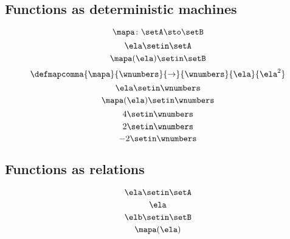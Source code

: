 \begin{forslides}
    \subsection{Functions as deterministic machines}

    \begin{equation}
        \label{eq:slides_session2_94}
        \mapa\colon \setA \sto \setB
    \end{equation}
    \begin{equation}
        \label{eq:slides_session2_95}
        \ela \setin\setA
    \end{equation}
    \begin{equation}
        \label{eq:slides_session2_96}
        \mapa(\ela) \setin\setB
    \end{equation}
    \begin{equation}
        \label{eq:slides_session2_97}
        \defmapcomma{
            \mapa
        }{
            \wnumbers
        }{
            \to
        }{
            \wnumbers
        }{
            \ela
        }{
            \ela^2
        }
    \end{equation}
    \begin{equation}
        \label{eq:slides_session2_98}
        \ela \setin\wnumbers
    \end{equation}
    \begin{equation}
        \label{eq:slides_session2_99}
        \mapa(\ela) \setin\wnumbers
    \end{equation}
    \begin{equation}
        \label{eq:slides_session2_100}
        4 \setin\wnumbers
    \end{equation}
    \begin{equation}
        \label{eq:slides_session2_101}
        2 \setin\wnumbers
    \end{equation}
    \begin{equation}
        \label{eq:slides_session2_102}
        -2 \setin\wnumbers
    \end{equation}

    \subsection{Functions as relations}

    \begin{equation}
        \label{eq:slides_session2_103}
        \ela \setin\setA
    \end{equation}
    \begin{equation}
        \label{eq:slides_session2_104}
        \ela
    \end{equation}
    \begin{equation}
        \label{eq:slides_session2_105}
        \elb \setin \setB
    \end{equation}
    \begin{equation}
        \label{eq:slides_session2_106}
        \mapa(\ela)
    \end{equation}


\end{forslides}
